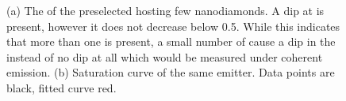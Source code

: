 			\begin{figure}[tp]
				\begin{subfigure}[t]{ 0.49\linewidth}
					\centering
					\caption{}
					\label{subfig::single_siv_g2_before_transfer_antenna}
				\end{subfigure}
				\hfill
				\begin{subfigure}[t]{ 0.49\linewidth}
					\centering
					\caption{}
					\label{subfig::single_siv_sat_before_transfer_antenna}
				\end{subfigure}
				\caption{(a) The \gtf of the preselected \nd hosting few nanodiamonds. A dip at \gtz is present, however it does not decrease below 0.5. While this indicates that more than one \siv is present, a small number of \sivs cause a dip in the \gtf instead of no dip at all which would be measured under coherent emission. (b) Saturation curve of the same emitter. Data points are black, fitted curve red.}
			\end{figure}

